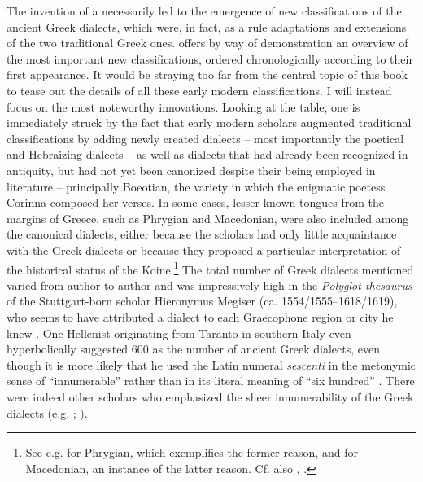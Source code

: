 The invention of a  necessarily led to the emergence of new classifications of the ancient Greek dialects, which were, in fact, as a rule adaptations and extensions of the two traditional Greek ones.  offers by way of demonstration an overview of the most important new classifications, ordered chronologically according to their first appearance. It would be straying too far from the central topic of this book to tease out the details of all these early modern classifications. I will instead focus on the most noteworthy innovations. Looking at the table, one is immediately struck by the fact that early modern scholars augmented traditional classifications by adding newly created dialects – most importantly the poetical and Hebraizing dialects – as well as dialects that had already been recognized in antiquity, but had not yet been canonized despite their being employed in literature – principally Boeotian, the variety in which the enigmatic poetess Corinna composed her verses. In some cases, lesser-known tongues from the margins of Greece, such as Phrygian and Macedonian, were also included among the canonical dialects, either because the scholars had only little acquaintance with the Greek dialects or because they proposed a particular interpretation of the historical status of the Koine.\footnote{See e.g. \citet[131]{Kircher1679} for Phrygian, which exemplifies the former reason, and \citet[\textsc{c.2}\textsc{\textsuperscript{v}}]{Schwartz1702} for Macedonian, an instance of the latter reason. Cf. also , .} The total number of Greek dialects mentioned varied from author to author and was impressively high in the \textit{Polyglot thesaurus} of the Stuttgart-born scholar Hieronymus Megiser (ca. 1554/1555–1618/1619), who seems to have attributed a dialect to each Graecophone region or city he knew \citep[{\footnotesize{)(}}.7\textsc{\textsuperscript{r-v}}]{Megiser1603}. One Hellenist originating from Taranto in southern Italy even hyperbolically suggested 600 as the number of ancient Greek dialects, even though it is more likely that he used the Latin numeral \textit{sescenti} in the metonymic sense of “innumerable” rather than in its literal meaning of “six hundred” \citep[9]{Giovane1589}. There were indeed other scholars who emphasized the sheer innumerability of the Greek dialects (e.g. \citealt[127]{Bischoff1708}; \citealt[196]{Ries1786}).

